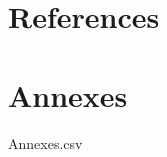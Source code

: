 \documentclass{article}%
\begin{document}
%
\newpage%
\section*{References}%
\label{sec:References}%
\printbibliography[heading=none]

%
%
\cleardoublepage%
\newpage%
\section*{Annexes}%
\label{sec:Annexes}%
Annexes.csv%
\linebreak

%
%
\cleardoublepage%
\end{document}

